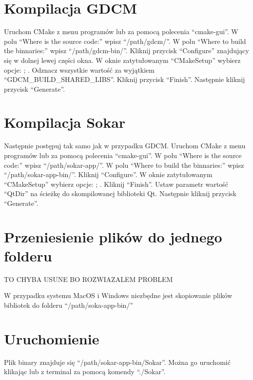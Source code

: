 \section{Kompilacja GDCM}

Uruchom CMake z menu programów lub za pomocą polecenia \enquote{cmake-gui}.
W polu \enquote{Where is the source code:} wpisz \enquote{/path/gdcm/}.
W polu \enquote{Where to build the binnaries:} wpisz \enquote{/path/gdcm-bin/}.
Kliknij przycisk \enquote{Configure} znajdujący się w dolnej lewej części okna.
W oknie zatytułowanym \enquote{CMakeSetup} wybierz opcje: ; .
Odznacz wszystkie wartość za wyjątkiem \enquote{GDCM\_BUILD\_SHARED\_LIBS}.
Kliknij przycisk \enquote{Finish}.
Następnie kliknij przycisk \enquote{Generate}.

\section{Kompilacja Sokar}

\par
Następnie postępuj tak samo jak w przypadku GDCM.
Uruchom CMake z menu programów lub za pomocą polecenia \enquote{cmake-gui}.
W polu \enquote{Where is the source code:} wpisz \enquote{/path/sokar-app/}.
W polu \enquote{Where to build the binnaries:} wpisz \enquote{/path/sokar-app-bin/}.
Kliknij \enquote{Configure}.
W oknie zatytułowanym \enquote{CMakeSetup} wybierz opcje: ; .
Kliknij \enquote{Finish}.
Ustaw parametr wartość \enquote{QtDir} na ścieżkę do skompilowanej biblioteki Qt.
Następnie kliknij przycisk \enquote{Generate}.

\section{Przeniesienie plików do jednego folderu}
TO CHYBA USUNE BO ROZWIAZALEM PROBLEM
\par
W przypadku systemu MacOS i Windows niezbędne jest skopiowanie plików bibliotek do folderu \enquote{/path/soka-app-bin/}

\section{Uruchomienie}

Plik binary znajduje się \enquote{/path/sokar-app-bin/Sokar}.
Można go uruchomić klikając lub z terminal za pomocą komendy \enquote{./Sokar}.